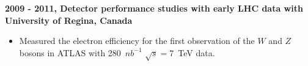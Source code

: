 \noindent\textbf{2009 - 2011, Detector performance studies with early LHC data with University of Regina, Canada}
\begin{itemize}
    \item Measured the electron efficiency for the first observation of the $W$ and $Z$ bosons in ATLAS with 
        280~$nb^{-1}$ $\sqrt{s} = 7$~TeV data.
\end{itemize}

